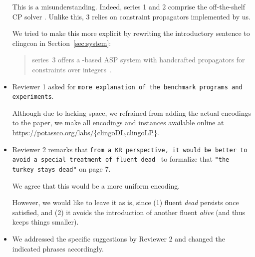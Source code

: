 \begin{itemize}
This is a misunderstanding. 
Indeed, \clingcon{} series 1 and 2 comprise the off-the-shelf CP solver \gecode.
Unlike this, \clingcon{} 3 relies on constraint propagators implemented by us.

We tried to make this more explicit by rewriting the introductory sentence to clingcon in Section~\ref{sec:system}:
\begin{quote}
\textbf{\clingcon} series~3 offers a \clingo-based ASP system with handcrafted propagators for constraints over integers~\cite{bakaossc16a}.  
\end{quote}

\item Reviewer 1 asked for {\tt more explanation of the benchmark programs and expe\-riments}.

Although due to lacking space,
we refrained from adding the actual encodings to the paper,
we make all encodings and instances available online at
\url{https://potassco.org/labs/{clingoDL,clingoLP}}.

\item Reviewer 2 remarks that
{\tt from a KR perspective, it would be better to avoid a special treatment of fluent dead} \
to formalize that {\tt "the turkey stays dead"} on page 7.

We agree that this would be a more uniform encoding.

However, we would like to leave it as is, since 
(1) fluent \textit{dead} persists once satisfied, and
(2) it avoids the introduction of another fluent \textit{alive}
(and thus keeps things smaller).
\item 
We addressed the specific suggestions by Reviewer 2 and changed the indicated phrases accordingly. 
\end{itemize}
